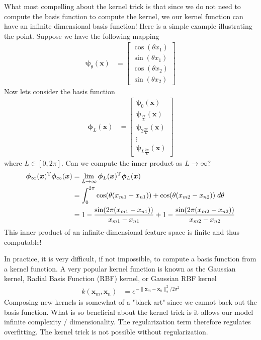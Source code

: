 \documentclass[11pt]{article}
\newcommand{\vct}[1]{\boldsymbol{#1}} %
\newcommand{\T}{^{\textrm T}} %
\begin{document}
What most compelling about the kernel trick is that since we do not need to compute the basis function to compute the kernel, we our kernel function can have an infinite dimensional basis function! Here is a simple example illustrating the point. Suppose we have the following mapping
\begin{align*}
\vct{\psi}_\theta(\vct{x}) &= \left[ \begin{array}{c} \cos(\theta x_1) \\ \sin(\theta x_1) \\ \cos(\theta x_2) \\ \sin(\theta x_2) \end{array} \right]
\end{align*}
Now lets consider the basis function
\begin{align*}
\vct{\phi}_L(\vct{x}) &= \left[ \begin{array}{c}  \vct{\psi}_0(\vct{x}) \\ \vct{\psi}_{\frac{2\pi}{L}}(\vct{x}) \\ \vct{\psi}_{2\frac{2\pi}{L}}(\vct{x}) \\ \vdots \\ \vct{\psi}_{L\frac{2\pi}{L}}(\vct{x})  \end{array} \right]
\end{align*}
where $L \in [0,2\pi]$. Can we compute the inner product as $L \to \infty$?
\begin{align*}
\vct{\phi}_\infty(\vct{x})\T\vct{\phi}_\infty(\vct{x}) &= \lim_{L \to \infty} \vct{\phi}_L(\vct{x})\T\vct{\phi}_L(\vct{x})\\
&= \int_0^{2\pi} \cos(\theta(x_{m1} - x_{n1})) + \cos(\theta(x_{m2} - x_{n2}))\; d\theta \\
&= 1 - \frac{\sin (2\pi(x_{m1} - x_{n1}))}{x_{m1} - x_{n1}} + 1 - \frac{\sin (2\pi(x_{m2} - x_{n2}))}{x_{m2} - x_{n2}}
\end{align*}
This inner product of an infinite-dimensional feature space is finite and thus computable!

In practice, it is very difficult, if not impossible, to compute a basis function from a kernel function. A very popular kernel function is known as the Gaussian kernel, Radial Basis Function (RBF) kernel, or Gaussian RBF kernel
\begin{align*}
k(\vct{x}_m, \vct{x}_n) &= e^{- \|\vct{x}_m - \vct{x}_n\|_2^2 / 2\sigma^2}
\end{align*}
Composing new kernels is somewhat of a "black art" since we cannot back out the basis function. What is so beneficial about the kernel trick is it allows our model infinite complexity / dimensionality. The regularization term therefore regulates overfitting. The kernel trick is not possible without regularization.
\end{document}
